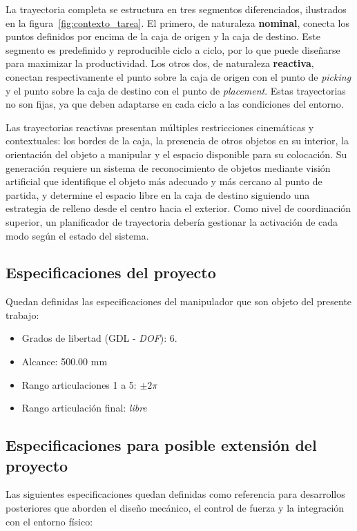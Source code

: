 \documentclass{article}
\begin{document}
La trayectoria completa se estructura en tres segmentos diferenciados, ilustrados en la figura~\ref{fig:contexto_tarea}. El primero, de naturaleza \textbf{nominal}, conecta los puntos definidos por encima de la caja de origen y la caja de destino. Este segmento es predefinido y reproducible ciclo a ciclo, por lo que puede diseñarse para maximizar la productividad. Los otros dos, de naturaleza \textbf{reactiva}, conectan respectivamente el punto sobre la caja de origen con el punto de \textit{picking} y el punto sobre la caja de destino con el punto de \textit{placement}. Estas trayectorias no son fijas, ya que deben adaptarse en cada ciclo a las condiciones del entorno.

Las trayectorias reactivas presentan múltiples restricciones cinemáticas y contextuales: los bordes de la caja, la presencia de otros objetos en su interior, la orientación del objeto a manipular y el espacio disponible para su colocación. Su generación requiere un sistema de reconocimiento de objetos mediante visión artificial que identifique el objeto más adecuado y más cercano al punto de partida, y determine el espacio libre en la caja de destino siguiendo una estrategia de relleno desde el centro hacia el exterior. Como nivel de coordinación superior, un planificador de trayectoria debería gestionar la activación de cada modo según el estado del sistema.

\subsection*{Especificaciones del proyecto}

Quedan definidas las especificaciones del manipulador que son objeto del presente trabajo:

\begin{itemize}
    \item Grados de libertad (GDL - \textit{DOF}): 6.
    \item Alcance: 500.00 mm
    \item Rango articulaciones 1 a 5: $\pm2\pi$
    \item Rango articulación final: \textit{libre}
\end{itemize}

\subsection*{Especificaciones para posible extensión del proyecto}

Las siguientes especificaciones quedan definidas como referencia para desarrollos posteriores que aborden el diseño mecánico, el control de fuerza y la integración con el entorno físico:
\end{document}
